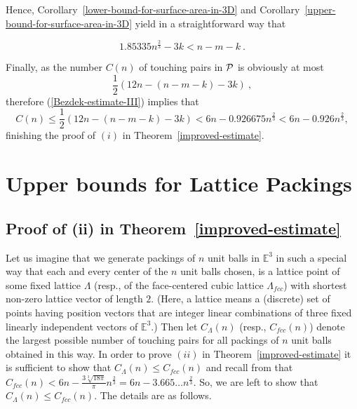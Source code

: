 \documentclass[10pt]{article}
\numberwithin{Subcase}{Case}
\begin{document}
Hence, Corollary~\ref{lower-bound-for-surface-area-in-3D} and Corollary~\ref{upper-bound-for-surface-area-in-3D} yield in a straightforward way that

\begin{equation}\label{Bezdek-estimate-III}
1.85335n^{\frac{2}{3}}-3k<n-m-k \ .
\end{equation}

Finally, as the number $C(n)$ of touching pairs in ${\cal P}$ is obviously at most $$
\frac{1}{2}\left( 12n-(n-m-k)-3k\right)\ ,
$$
therefore (\ref{Bezdek-estimate-III}) implies that
$$
C(n)\le \frac{1}{2}\left( 12n-(n-m-k)-3k\right)
< 6n-0.926675n^{\frac{2}{3}}
<6n-0.926n^{\frac{2}{3}},
$$
finishing the proof of $(i)$ in Theorem~\ref{improved-estimate}.


\section{Upper bounds for Lattice Packings}
\subsection{Proof of (ii) in Theorem~\ref{improved-estimate}}



Let us imagine that we generate packings of $n$ unit balls in $\mathbb{E}^{3}$ in such a special way that each and every center of the $n$ unit balls chosen, is a lattice point of some fixed lattice $\Lambda$ (resp., of the face-centered cubic lattice $\Lambda_{fcc}$) with shortest non-zero lattice vector of length $2$. (Here, a lattice means a (discrete) set of points having position vectors that are integer linear combinations of three fixed linearly independent vectors of $\mathbb{E}^{3}$.) Then let $C_{\Lambda}(n)$ (resp., $C_{fcc}(n)$) denote the largest possible number of touching pairs for all packings of $n$ unit balls obtained in this way. In order to prove $(ii)$ in Theorem~\ref{improved-estimate} it is sufficient to show that $C_{\Lambda}(n)\le C_{fcc}(n)$ and recall from \cite{B12} that $C_{fcc}(n)< 6n-\frac{3\sqrt[3]{18\pi}}{\pi}n^{\frac{2}{3}}=6n-3.665\dots n^{\frac{2}{3}}$. So, we are left to show that $C_{\Lambda}(n)\le C_{fcc}(n)$. The details are as follows.
\end{document}
